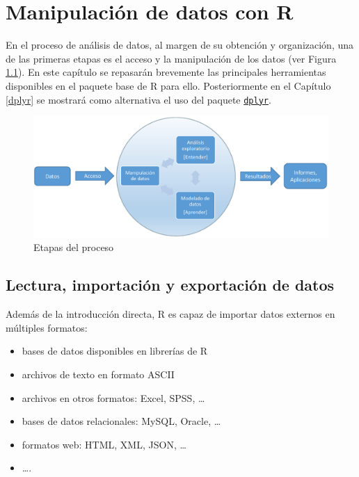 \documentclass[]{book}
\begin{document}
\chapter{Manipulación de datos con
R}\label{manipulaciuxf3n-de-datos-con-r}

En el proceso de análisis de datos, al margen de su obtención y
organización, una de las primeras etapas es el acceso y la manipulación
de los datos (ver Figura \ref{fig:esquema2}). En este capítulo se
repasarán brevemente las principales herramientas disponibles en el
paquete base de R para ello. Posteriormente en el Capítulo \ref{dplyr}
se mostrará como alternativa el uso del paquete
\href{https://dplyr.tidyverse.org/index.html}{\texttt{dplyr}}.

\begin{figure}[!htb]

{\centering \includegraphics[width=0.8\linewidth]{images/esquema2} 

}

\caption{Etapas del proceso}\label{fig:esquema2}
\end{figure}

\section{Lectura, importación y exportación de
datos}\label{lectura-importaciuxf3n-y-exportaciuxf3n-de-datos}

Además de la introducción directa, R es capaz de importar datos externos
en múltiples formatos:

\begin{itemize}
\item
  bases de datos disponibles en librerías de R
\item
  archivos de texto en formato ASCII
\item
  archivos en otros formatos: Excel, SPSS, \ldots{}
\item
  bases de datos relacionales: MySQL, Oracle, \ldots{}
\item
  formatos web: HTML, XML, JSON, \ldots{}
\item
  \ldots{}.
\end{itemize}
\end{document}
